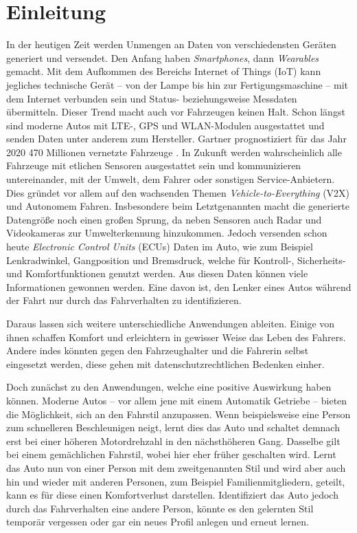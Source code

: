 %
%
%
%
%


\chapter{Einleitung}
\label{chap:intro}

In der heutigen Zeit werden Unmengen an Daten von verschiedensten Geräten generiert und versendet. Den Anfang haben \textit{Smartphones}, dann \textit{Wearables} gemacht. Mit dem Aufkommen des Bereichs Internet of Things (IoT) kann jegliches technische Gerät – von der Lampe bis hin zur Fertigungsmaschine – mit dem Internet verbunden sein und Status- beziehungsweise Messdaten übermitteln. Dieser Trend macht auch vor Fahrzeugen keinen Halt. Schon längst sind moderne Autos mit LTE-, GPS und WLAN-Modulen ausgestattet und senden Daten unter anderem zum Hersteller. Gartner prognostiziert für das Jahr 2020 470 Millionen vernetzte Fahrzeuge \cite{Gartner2019}. In Zukunft werden wahrscheinlich alle Fahrzeuge mit etlichen Sensoren ausgestattet sein und kommunizieren untereinander, mit der Umwelt, dem Fahrer oder sonstigen Service-Anbietern. Dies gründet vor allem auf den wachsenden Themen \textit{Vehicle-to-Everything} (V2X) und Autonomem Fahren. Insbesondere beim Letztgenannten macht die generierte Datengröße noch einen großen Sprung, da neben Sensoren auch Radar und Videokameras zur Umwelterkennung hinzukommen. Jedoch versenden schon heute \textit{Electronic Control Units} (ECUs) Daten im Auto, wie zum Beispiel Lenkradwinkel, Gangposition und Bremsdruck, welche für Kontroll-, Sicherheits- und Komfortfunktionen genutzt werden. Aus diesen Daten können viele Informationen gewonnen werden. Eine davon ist, den Lenker eines Autos während der Fahrt nur durch das Fahrverhalten zu identifizieren.

Daraus lassen sich weitere unterschiedliche Anwendungen ableiten. Einige von ihnen schaffen Komfort und erleichtern in gewisser Weise das Leben des Fahrers. Andere indes könnten gegen den Fahrzeughalter und die Fahrerin selbst eingesetzt werden, diese gehen mit datenschutzrechtlichen Bedenken einher.

Doch zunächst zu den Anwendungen, welche eine positive Auswirkung haben können. Moderne Autos – vor allem jene mit einem Automatik Getriebe – bieten die Möglichkeit, sich an den Fahrstil anzupassen. Wenn beispielsweise eine Person zum schnelleren Beschleunigen neigt, lernt dies das Auto und schaltet demnach erst bei einer höheren Motordrehzahl in den nächsthöheren Gang. Dasselbe gilt bei einem gemächlichen Fahrstil, wobei hier eher früher geschalten wird. Lernt das Auto nun von einer Person mit dem zweitgenannten Stil und wird aber auch hin und wieder mit anderen Personen, zum Beispiel Familienmitgliedern, geteilt, kann es für diese einen Komfortverlust darstellen. Identifiziert das Auto jedoch durch das Fahrverhalten eine andere Person, könnte es den gelernten Stil temporär vergessen oder gar ein neues Profil anlegen und erneut lernen.


